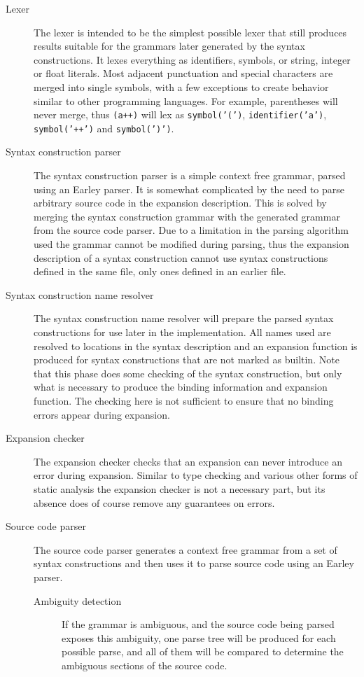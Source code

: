 \documentclass{kththesis}
\begin{document}
\begin{description}
  \item[Lexer] The lexer is intended to be the simplest possible lexer that still produces results suitable for the grammars later generated by the syntax constructions. It lexes everything as identifiers, symbols, or string, integer or float literals. Most adjacent punctuation and special characters are merged into single symbols, with a few exceptions to create behavior similar to other programming languages. For example, parentheses will never merge, thus \texttt{(a++)} will lex as \texttt{symbol('(')}, \texttt{identifier('a')}, \texttt{symbol('++')} and \texttt{symbol(')')}.

  \item[Syntax construction parser] The syntax construction parser is a simple context free grammar, parsed using an Earley parser. It is somewhat complicated by the need to parse arbitrary source code in the expansion description. This is solved by merging the syntax construction grammar with the generated grammar from the source code parser. Due to a limitation in the parsing algorithm used the grammar cannot be modified during parsing, thus the expansion description of a syntax construction cannot use syntax constructions defined in the same file, only ones defined in an earlier file.

  \item[Syntax construction name resolver] The syntax construction name resolver will prepare the parsed syntax constructions for use later in the implementation. All names used are resolved to locations in the syntax description and an expansion function is produced for syntax constructions that are not marked as builtin. Note that this phase does some checking of the syntax construction, but only what is necessary to produce the binding information and expansion function. The checking here is not sufficient to ensure that no binding errors appear during expansion.

  \item[Expansion checker] The expansion checker checks that an expansion can never introduce an error during expansion. Similar to type checking and various other forms of static analysis the expansion checker is not a necessary part, but its absence does of course remove any guarantees on errors.

  \item[Source code parser] The source code parser generates a context free grammar from a set of syntax constructions and then uses it to parse source code using an Earley parser.
  \begin{description}
    \item[Ambiguity detection] If the grammar is ambiguous, and the source code being parsed exposes this ambiguity, one parse tree will be produced for each possible parse, and all of them will be compared to determine the ambiguous sections of the source code.
  \end{description}


\end{description}
\end{document}
